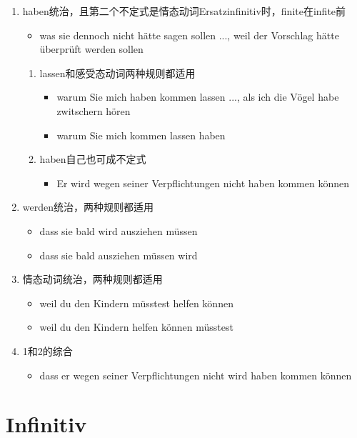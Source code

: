 \documentclass[UTF8]{report}
\begin{document}
\begin{enumerate}
    \item haben统治，且第二个不定式是情态动词Ersatzinfinitiv时，finite在infite前
    \begin{itemize}
        \item was sie dennoch nicht hätte sagen sollen ..., weil der Vorschlag hätte überprüft werden sollen
    \end{itemize}
    \begin{enumerate}
        \item lassen和感受态动词两种规则都适用
        \begin{itemize}
            \item warum Sie mich haben kommen lassen ..., als ich die Vögel habe zwitschern hören
            \item warum Sie mich kommen lassen haben
        \end{itemize}
        \item haben自己也可成不定式
        \begin{itemize}
            \item Er wird wegen seiner Verpflichtungen nicht haben kommen können
        \end{itemize}
    \end{enumerate}
    \item werden统治，两种规则都适用
    \begin{itemize}
        \item dass sie bald wird ausziehen müssen
        \item dass sie bald ausziehen müssen wird
    \end{itemize}
    \item 情态动词统治，两种规则都适用
    \begin{itemize}
        \item weil du den Kindern müsstest helfen können
        \item weil du den Kindern helfen können müsstest
    \end{itemize}
    \item 1和2的综合
    \begin{itemize}
        \item dass er wegen seiner Verpflichtungen nicht wird haben kommen können
    \end{itemize}
\end{enumerate}

\section{Infinitiv}
\end{document}
